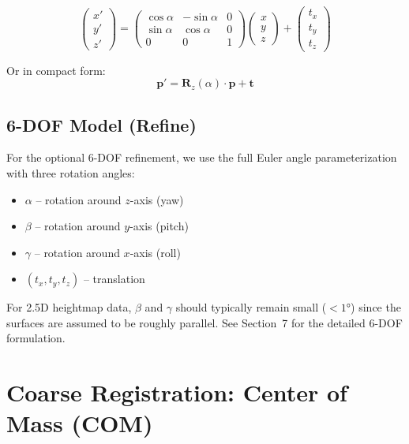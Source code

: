 \documentclass[11pt,a4paper]{article}
\begin{document}
\begin{equation}
\begin{pmatrix} x' \\ y' \\ z' \end{pmatrix} =
\begin{pmatrix}
\cos\alpha & -\sin\alpha & 0 \\
\sin\alpha & \cos\alpha & 0 \\
0 & 0 & 1
\end{pmatrix}
\begin{pmatrix} x \\ y \\ z \end{pmatrix}
+
\begin{pmatrix} t_x \\ t_y \\ t_z \end{pmatrix}
\label{eq:transform}
\end{equation}

Or in compact form:
\begin{equation}
\mathbf{p}' = \mathbf{R}_z(\alpha) \cdot \mathbf{p} + \mathbf{t}
\end{equation}

\subsection{6-DOF Model (Refine)}

For the optional 6-DOF refinement, we use the full Euler angle parameterization with three rotation angles:
\begin{itemize}
    \item $\alpha$ -- rotation around $z$-axis (yaw)
    \item $\beta$ -- rotation around $y$-axis (pitch)
    \item $\gamma$ -- rotation around $x$-axis (roll)
    \item $(t_x, t_y, t_z)$ -- translation
\end{itemize}

For 2.5D heightmap data, $\beta$ and $\gamma$ should typically remain small ($< 1°$) since the surfaces are assumed to be roughly parallel. See Section~7 for the detailed 6-DOF formulation.

\section{Coarse Registration: Center of Mass (COM)}
\end{document}
